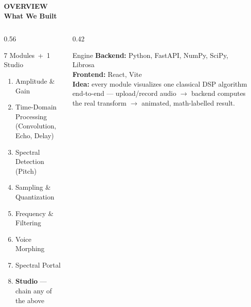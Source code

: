 \documentclass[aspectratio=169]{beamer}
\newcommand{\ModuleTitle}[2]{%
  {\scriptsize\color{textMuted}\bfseries\sffamily #1}\\[0.15em]
  {\Large\bfseries\color{goldAccent} #2}\\[0.4em]
}
\begin{document}
\begin{frame}
  \ModuleTitle{OVERVIEW}{What We Built}
  \begin{columns}[T]
    \begin{column}{0.56\linewidth}
      \begin{block}{7 Modules \,+\, 1 Studio}
        \begin{enumerate}
          \setlength\itemsep{0.35em}
          \item Amplitude \& Gain
          \item Time-Domain Processing \textcolor{textMuted}{\small(Convolution, Echo, Delay)}
          \item Spectral Detection \textcolor{textMuted}{\small(Pitch)}
          \item Sampling \& Quantization
          \item Frequency \& Filtering
          \item Voice Morphing
          \item Spectral Portal
          \item[$\star$] \textbf{Studio} --- chain any of the above
        \end{enumerate}
      \end{block}
    \end{column}
    \begin{column}{0.42\linewidth}
      \begin{block}{Engine}
        \small
        \textbf{Backend:} Python, FastAPI, NumPy, SciPy, Librosa\\[0.6em]
        \textbf{Frontend:} React, Vite\\[0.6em]
        \textbf{Idea:} every module visualizes one classical DSP algorithm end-to-end --- upload/record audio $\rightarrow$ backend computes the real transform $\rightarrow$ animated, math-labelled result.
      \end{block}
    \end{column}
  \end{columns}
\end{frame}
\end{document}

